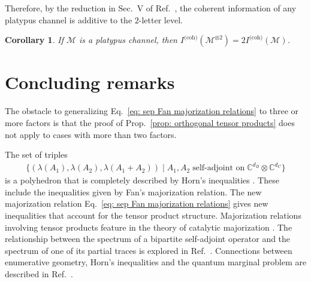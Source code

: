 \documentclass[12pt]{article}
\newtheorem{cor}[thm]{Corollary}
\theoremstyle{definition}
\numberwithin{equation}{section}
\numberwithin{equation}{section}
\newcommand{\la}{\lambda}
\newcommand{\cM}{\mathcal{M}}
\newcommand{\bC}{\mathbb{C}}
\begin{document}
Therefore, by the reduction in Sec.~V of Ref.~\cite{Leditzky_2023}, the coherent information of any platypus channel is additive to the \(2\)-letter level.
\begin{cor}
\label{cor: platypus channel additivity}
If \(\cM\) is a platypus channel, then \(I^{\text{(coh)}}({\mathcal{M}}^{\otimes 2})=2 I^{\text{(coh)}} ({\mathcal{M}})\).
\end{cor}





\section{Concluding remarks}
\label{sec: conclusion}
The obstacle to generalizing Eq.~\ref{eq: sep Fan majorization relations} to three or more factors is that the proof of Prop.~\ref{prop: orthogonal tensor products} does not apply to cases with more than two factors.


The set of triples
\begin{gather}
\{(\la(A_1), \la(A_2), \la(A_1 + A_2)) \mid A_1, A_2 \; \text{self-adjoint on} \; \bC^{d_B} \otimes \bC^{d_C}\}    
\end{gather}
is a polyhedron that is completely described by Horn's inequalities \cite{Bhatia2001}. These include the inequalities given by Fan's majorization relation. The new majorization relation Eq.~\ref{eq: sep Fan majorization relations} gives new inequalities that account for the tensor product structure. Majorization relations involving tensor products feature in the theory of catalytic majorization \cite{Aubrun2008}. The relationship between the spectrum of a bipartite self-adjoint operator and the spectrum of one of its partial traces is explored in Ref.~\cite{DAFTUAR200580}. Connections between enumerative geometry, Horn's inequalities and the quantum marginal problem are described in Ref.~\cite{Knutson2009}. 
\end{document}
